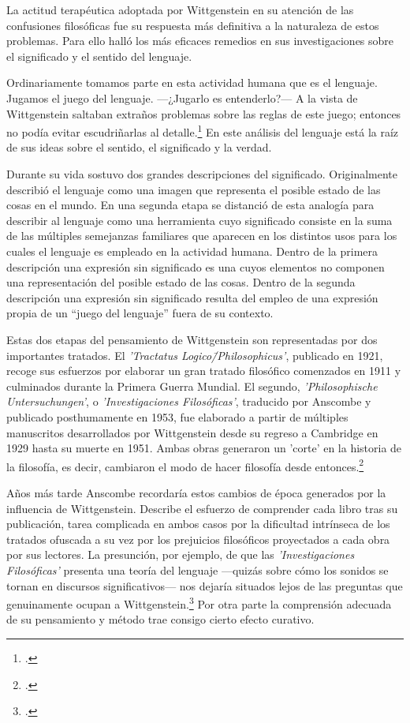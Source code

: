 La actitud terapéutica adoptada por Wittgenstein en su atención de las
confusiones filosóficas fue su respuesta más definitiva a la naturaleza de estos
problemas. Para ello halló los más eficaces remedios en sus investigaciones
sobre el significado y el sentido del lenguaje.

Ordinariamente tomamos parte en esta actividad humana que es el lenguaje.
Jugamos el juego del lenguaje. ---¿Jugarlo es entenderlo?--- A la vista de
Wittgenstein saltaban extraños problemas sobre las reglas de este juego;
entonces no podía evitar escudriñarlas al
detalle.\footcite[cf.~][loc.7099]{monk} En este análisis del lenguaje está la
raíz de sus ideas sobre el sentido, el significado y la verdad.

Durante su vida sostuvo dos grandes descripciones del significado. Originalmente
describió el lenguaje como una imagen que representa el posible estado de las
cosas en el mundo. En una segunda etapa se distanció de esta analogía para
describir al lenguaje como una herramienta cuyo significado consiste en la suma
de las múltiples semejanzas familiares que aparecen en los distintos usos para
los cuales el lenguaje es empleado en la actividad humana. Dentro de la primera
descripción una expresión sin significado es una cuyos elementos no componen una
representación del posible estado de las cosas. Dentro de la segunda descripción
una expresión sin significado resulta del empleo de una expresión propia de un
``juego del lenguaje'' fuera de su contexto.

Estas dos etapas del pensamiento de Wittgenstein son representadas por dos
importantes tratados. El \emph{'Tractatus Logico\=/Philosophicus'}, publicado
en 1921, recoge sus esfuerzos por elaborar un gran tratado filosófico
comenzados en 1911 y culminados durante la Primera Guerra Mundial. El segundo,
\emph{'Philosophische Untersuchungen'}, o \emph{'Investigaciones
  Filosóficas'}, traducido por Anscombe y publicado posthumamente en 1953, fue
elaborado a partir de múltiples manuscritos desarrollados por Wittgenstein
desde su regreso a Cambridge en 1929 hasta su muerte en 1951. Ambas obras
generaron un 'corte' en la historia de la filosofía, es decir, cambiaron el
modo de hacer filosofía desde entonces.\footcite[cf.~][p.~181]{twocuts}

Años más tarde Anscombe recordaría estos cambios de época generados por la
influencia de Wittgenstein. Describe el esfuerzo de comprender cada libro tras
su publicación, tarea complicada en ambos casos por la dificultad intrínseca
de los tratados ofuscada a su vez por los prejuicios filosóficos proyectados a
cada obra por sus lectores. La presunción, por ejemplo, de que las
\emph{'Investigaciones Filosóficas'} presenta una teoría del lenguaje
---quizás sobre cómo los sonidos se tornan en discursos significativos--- nos
dejaría situados lejos de las preguntas que genuinamente ocupan a
Wittgenstein.\footcite[cf.~][p.~183]{twocuts} Por otra parte la comprensión
adecuada de su pensamiento y método trae consigo cierto efecto curativo.

